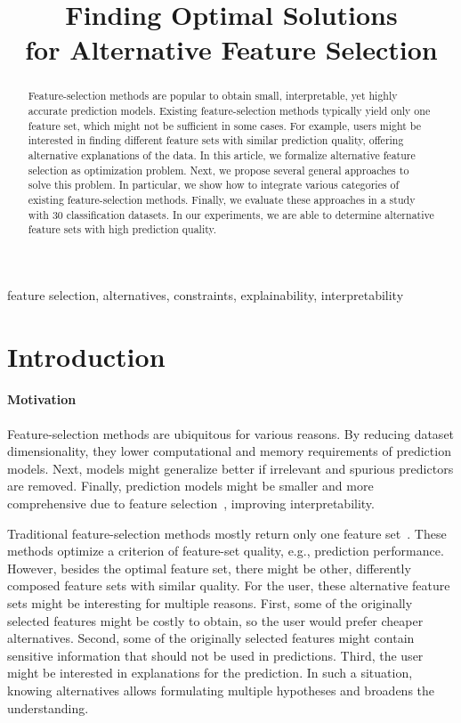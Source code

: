 \documentclass[conference]{IEEEtran}
\title{Finding Optimal Solutions \\ for Alternative Feature Selection}
\author{
	\IEEEauthorblockN{Jakob Bach}
	\IEEEauthorblockA{
		\textit{Department of Informatics} \\
		\textit{Karlsruhe Institute of Technologie (KIT)}\\
		Karlsruhe, Germany \\
		jakob.bach@kit.edu
	}
}
\theoremstyle{definition}
\begin{document}
\maketitle

\begin{abstract}
Feature-selection methods are popular to obtain small, interpretable, yet highly accurate prediction models.
Existing feature-selection methods typically yield only one feature set, which might not be sufficient in some cases.
For example, users might be interested in finding different feature sets with similar prediction quality, offering alternative explanations of the data.
In this article, we formalize alternative feature selection as optimization problem.
Next, we propose several general approaches to solve this problem.
In particular, we show how to integrate various categories of existing feature-selection methods.
Finally, we evaluate these approaches in a study with 30 classification datasets.
In our experiments, we are able to determine alternative feature sets with high prediction quality.
\end{abstract}

\begin{IEEEkeywords}
feature selection, alternatives, constraints, explainability, interpretability
\end{IEEEkeywords}

\section{Introduction}
\label{sec:introduction}

\paragraph{Motivation}

Feature-selection methods are ubiquitous for various reasons.
By reducing dataset dimensionality, they lower computational and memory requirements of prediction models.
Next, models might generalize better if irrelevant and spurious predictors are removed.
Finally, prediction models might be smaller and more comprehensive due to feature selection~\cite{li2017feature}, improving interpretability.

Traditional feature-selection methods mostly return only one feature set~\cite{borboudakis2021extending}.
These methods optimize a criterion of feature-set quality, e.g., prediction performance.
However, besides the optimal feature set, there might be other, differently composed feature sets with similar quality.
For the user, these alternative feature sets might be interesting for multiple reasons.
First, some of the originally selected features might be costly to obtain, so the user would prefer cheaper alternatives.
Second, some of the originally selected features might contain sensitive information that should not be used in predictions.
Third, the user might be interested in explanations for the prediction.
In such a situation, knowing alternatives allows formulating multiple hypotheses and broadens the understanding.
\end{document}
